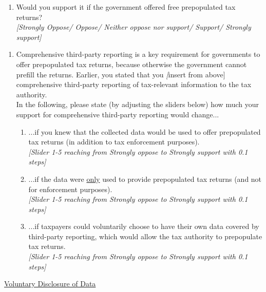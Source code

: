 \documentclass[11pt]{article}
\begin{document}
\begin{enumerate}[resume]
    \item Would you support it if the government offered free prepopulated tax returns?  \\
    \textit{[Strongly Oppose/ Oppose/ Neither oppose nor support/ Support/ Strongly support]}
\end{enumerate}
\begin{enumerate}[resume]
    \item \label{question:tprsupportupdated}Comprehensive third-party reporting is a key requirement for governments to offer prepopulated tax returns, because otherwise the government cannot prefill the returns. Earlier, you stated that you \textit[insert from above] comprehensive third-party reporting of tax-relevant information to the tax authority.\\[0.5em] In the following, please state (by adjusting the sliders below) how much your support for comprehensive third-party reporting would change... 
    \begin{enumerate}
    \item ...if you knew that the collected data would be used to offer prepopulated tax returns (in addition to tax enforcement purposes). \\ \textit{[Slider 1-5 reaching from Strongly oppose to Strongly support with 0.1 steps]}  
    \item ...if the data were \underline{only} used to provide prepopulated tax returns (and not for enforcement purposes). \\ \textit{[Slider 1-5 reaching from Strongly oppose to Strongly support with 0.1 steps]} 
    \item ...if taxpayers could voluntarily choose to have their own data covered by third-party reporting, which would allow the tax authority to prepopulate tax returns. \\ 
    \textit{[Slider 1-5 reaching from Strongly oppose to Strongly support with 0.1 steps]} 
\end{enumerate}
\end{enumerate}
\underline{Voluntary Disclosure of Data} \\
\end{document}

